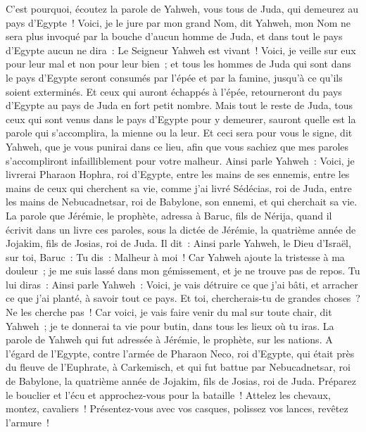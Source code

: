 \begin{multicols}{2}
C'est pourquoi, écoutez la parole de Yahweh, vous tous de Juda, qui demeurez au pays d'Egypte~! Voici, je le jure par mon grand Nom, dit Yahweh, mon Nom ne sera plus invoqué par la bouche d'aucun homme de Juda, et dans tout le pays d'Egypte aucun ne dira~: Le Seigneur Yahweh est vivant~!
Voici, je veille sur eux pour leur mal et non pour leur bien~; et tous les hommes de Juda qui sont dans le pays d'Egypte seront consumés par l'épée et par la famine, jusqu'à ce qu'ils soient exterminés.
Et ceux qui auront échappés à l'épée, retourneront du pays d'Egypte au pays de Juda en fort petit nombre. Mais tout le reste de Juda, tous ceux qui sont venus dans le pays d'Egypte pour y demeurer, sauront quelle est la parole qui s'accomplira, la mienne ou la leur.
Et ceci sera pour vous le signe, dit Yahweh, que je vous punirai dans ce lieu, afin que vous sachiez que mes paroles s'accompliront infailliblement pour votre malheur.
Ainsi parle Yahweh~: Voici, je livrerai Pharaon Hophra, roi d'Egypte, entre les mains de ses ennemis, entre les mains de ceux qui cherchent sa vie, comme j'ai livré Sédécias, roi de Juda, entre les mains de Nebucadnetsar, roi de Babylone, son ennemi, et qui cherchait sa vie.
\VerseOne{}La parole que Jérémie, le prophète, adressa à Baruc, fils de Nérija, quand il écrivit dans un livre ces paroles, sous la dictée de Jérémie, la quatrième année de Jojakim, fils de Josias, roi de Juda. Il dit~:
Ainsi parle Yahweh, le Dieu d'Israël, sur toi, Baruc~:
Tu dis~: Malheur à moi~! Car Yahweh ajoute la tristesse à ma douleur~; je me suis lassé dans mon gémissement, et je ne trouve pas de repos.
Tu lui diras~: Ainsi parle Yahweh~: Voici, je vais détruire ce que j'ai bâti, et arracher ce que j'ai planté, à savoir tout ce pays.
Et toi, chercherais-tu de grandes choses~? Ne les cherche pas~! Car voici, je vais faire venir du mal sur toute chair, dit Yahweh~; je te donnerai ta vie pour butin, dans tous les lieux où tu iras.
\VerseOne{}La parole de Yahweh qui fut adressée à Jérémie, le prophète, sur les nations.
A l'égard de l'Egypte, contre l'armée de Pharaon Neco, roi d'Egypte, qui était près du fleuve de l'Euphrate, à Carkemisch, et qui fut battue par Nebucadnetsar, roi de Babylone, la quatrième année de Jojakim, fils de Josias, roi de Juda.
Préparez le bouclier et l'écu et approchez-vous pour la bataille~!
Attelez les chevaux, montez, cavaliers~! Présentez-vous avec vos casques, polissez vos lances, revêtez l'armure~!

\end{multicols}
